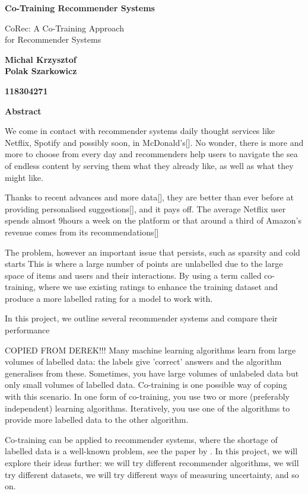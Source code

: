 \thispagestyle{plain}

\begin{center}
    \Large
    \textbf{Co-Training Recommender Systems}
    
    \vspace{0.4cm}
    \large
     CoRec: A Co-Training Approach \\ for Recommender Systems
    
    \vspace{0.4cm}
    
    \textbf{Michal Krzysztof \\ Polak Szarkowicz}
    
    \vspace{0.4cm} 
    
    \textbf{118304271}
    
    \vspace{0.9cm}
     
    \textbf{Abstract}
\end{center}
 
We come in contact with recommender systems daily thought services like Netflix, Spotify and possibly soon, in McDonald’s[]. No wonder, there is more and more to choose from every day and recommenders help users to navigate the sea of endless content by serving them what they already like, as well as what they might like.

Thanks to recent advances and more data[], they are better than ever before at providing personalised suggestions[], and it pays off. The average Netflix user spends almost 9hours a week on the platform or that around a third of Amazon’s revenue comes from its recommendations[]

The problem, however an important issue that persists, such as sparsity and cold starts This is where a large number of points are unlabelled due to the large space of items and users and their interactions. By using a term called co-training, where we use existing ratings to enhance the training dataset and produce a more labelled rating for a model to work with. 

In this project, we outline several recommender systems and compare their performance


COPIED FROM DEREK!!!
Many machine learning algorithms learn from large volumes of labelled data: the labels give 'correct' answers and the algorithm generalises from these. Sometimes, you have large volumes of unlabeled data but only small volumes of labelled data. Co-training is one possible way of coping with this scenario. In one form of co-training, you use two or more (preferably independent) learning algorithms. Iteratively, you use one of the algorithms to provide more labelled data to the other algorithm.

Co-training can be applied to recommender systems, where the shortage of labelled data is a well-known problem, see the paper by \cite{corec}. In this project, we will explore their ideas further: we will try different recommender algorithms, we will try different datasets, we will try different ways of measuring uncertainty, and so on.


